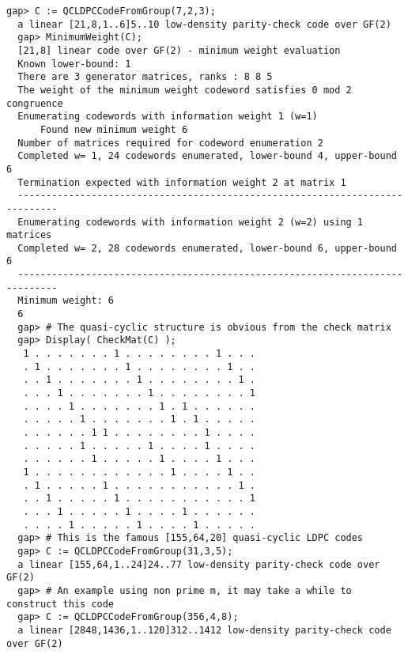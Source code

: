 \documentclass[a4paper,11pt]{report}
\begin{document}
{{ 
\begin{Verbatim}[fontsize=\small,frame=single,label=Example]
  gap> C := QCLDPCCodeFromGroup(7,2,3);
  a linear [21,8,1..6]5..10 low-density parity-check code over GF(2)
  gap> MinimumWeight(C);
  [21,8] linear code over GF(2) - minimum weight evaluation
  Known lower-bound: 1
  There are 3 generator matrices, ranks : 8 8 5 
  The weight of the minimum weight codeword satisfies 0 mod 2 congruence
  Enumerating codewords with information weight 1 (w=1)
      Found new minimum weight 6
  Number of matrices required for codeword enumeration 2
  Completed w= 1, 24 codewords enumerated, lower-bound 4, upper-bound 6
  Termination expected with information weight 2 at matrix 1
  -----------------------------------------------------------------------------
  Enumerating codewords with information weight 2 (w=2) using 1 matrices
  Completed w= 2, 28 codewords enumerated, lower-bound 6, upper-bound 6
  -----------------------------------------------------------------------------
  Minimum weight: 6
  6
  gap> # The quasi-cyclic structure is obvious from the check matrix
  gap> Display( CheckMat(C) );
   1 . . . . . . . 1 . . . . . . . . 1 . . .
   . 1 . . . . . . . 1 . . . . . . . . 1 . .
   . . 1 . . . . . . . 1 . . . . . . . . 1 .
   . . . 1 . . . . . . . 1 . . . . . . . . 1
   . . . . 1 . . . . . . . 1 . 1 . . . . . .
   . . . . . 1 . . . . . . . 1 . 1 . . . . .
   . . . . . . 1 1 . . . . . . . . 1 . . . .
   . . . . . 1 . . . . . 1 . . . . 1 . . . .
   . . . . . . 1 . . . . . 1 . . . . 1 . . .
   1 . . . . . . . . . . . . 1 . . . . 1 . .
   . 1 . . . . . 1 . . . . . . . . . . . 1 .
   . . 1 . . . . . 1 . . . . . . . . . . . 1
   . . . 1 . . . . . 1 . . . . 1 . . . . . .
   . . . . 1 . . . . . 1 . . . . 1 . . . . .
  gap> # This is the famous [155,64,20] quasi-cyclic LDPC codes
  gap> C := QCLDPCCodeFromGroup(31,3,5);
  a linear [155,64,1..24]24..77 low-density parity-check code over GF(2)
  gap> # An example using non prime m, it may take a while to construct this code
  gap> C := QCLDPCCodeFromGroup(356,4,8);
  a linear [2848,1436,1..120]312..1412 low-density parity-check code over GF(2)
\end{Verbatim}
  }

 }

 
\end{document}
